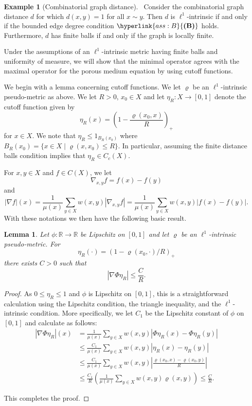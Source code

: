 \documentclass[letterpaper]{article}
\newtheorem{lemma}{Lemma}[section]
\theoremstyle{definition}
\newtheorem{example}{Example}
\theoremstyle{named}
\numberwithin{equation}{section}
\newcommand{\B}{\hyperlink{ass:B}{\textup{\textbf{(B)}}}}
\newcommand{\R}{\mathbb{R}}
\begin{document}
\begin{example}[Combinatorial graph distance]~\label{ex:combinatorial}
Consider the combinatorial graph distance $d$ for which $d(x,y)=1$
for all $x \sim y$. Then $d$ is $\ell^1$-intrinsic if and only if
the bounded edge degree
condition $\B$ holds. Furthermore,
$d$ has finite balls if and only if the graph is locally finite.
\end{example}

Under the assumptions of an $\ell^1$-intrinsic metric having finite balls
and uniformity of measure,
we will show that the minimal operator agrees with the maximal operator for
the porous medium equation by using cutoff functions.  

We begin with a lemma concerning cutoff functions.
We let $\varrho$ be an $\ell^1$-intrinsic pseudo-metric as above. We let $R>0$, $x_0 \in X$ and let
$\eta_R \colon X \to [0, 1]$ denote the cutoff function given by
$$\eta_R(x) = \left(1 - \frac{\varrho(x_0, x)}{R} \right)_+$$
for $x \in X$.
We note that $\eta_R \leq 1_{B_R(x_0)}$ where
$B_R(x_0)=\{ x \in X \mid \varrho(x, x_0) \leq R \}$. In particular,
assuming the finite distance balls condition implies
that $\eta_R \in C_c(X)$.

For $x,y \in X$ and $f \in C(X)$, we let
$$\nabla_{x,y} f = f(x)-f(y)$$
and
$$|\nabla f|(x) = \frac{1}{\mu(x)} \sum_{y \in X} w(x,y)|\nabla_{x,y}f|= \frac{1}{\mu(x)} \sum_{y \in X} w(x,y)|f(x)-f(y)|.$$
With these notations we then have the following basic result.


\begin{lemma}\label{l:cutoff}
Let $\phi\colon \R \to \R$ be Lipschitz on $[0,1]$ and let $\varrho$ be an $\ell^1$-intrinsic pseudo-metric.
For
\[
\eta_R(\cdot) = \left(1 - {\varrho(x_0, \cdot)}/{R} \right)_+
\]
there exists $C>0$ such that
\[
| \nabla \Phi\eta_R | \leq \frac{C}{R}.
\]
\end{lemma}
\begin{proof}
As $0 \leq \eta_R \leq 1$ and $\phi$ is Lipschitz on $[0,1]$,
this is a straightforward calculation using the Lipschitz condition,  
the triangle inequality, and the $\ell^1$-intrinsic condition. More specifically,
we let $C_1$ be the Lipschitz constant of $\phi$ on $[0,1]$ and calculate as follows:
\begin{align*}
|\nabla \Phi \eta_R |(x) &=  
\frac{1}{\mu(x)} \sum_{y \in X}  w(x,y) \left| \Phi \eta_R(x) - \Phi\eta_R(y)\right| \\
&\leq \frac{C_1}{\mu(x)} \sum_{y \in X}  w(x,y) \left| \eta_R(x) - \eta_R(y)\right| \\
& \leq \frac{C_1}{\mu(x)} \sum_{y \in X} w(x,y)\left|\frac{\varrho(x_0,x) -\varrho(x_0,y)}{R}\right|  \\
&\leq \frac{C_1}{R}\left(\frac{
1}{\mu(x)} \sum_{y \in X} w(x,y)\varrho(x,y)\right) \leq \frac{C}{R}.
\end{align*}

This completes the proof.
\end{proof}
\end{document}
